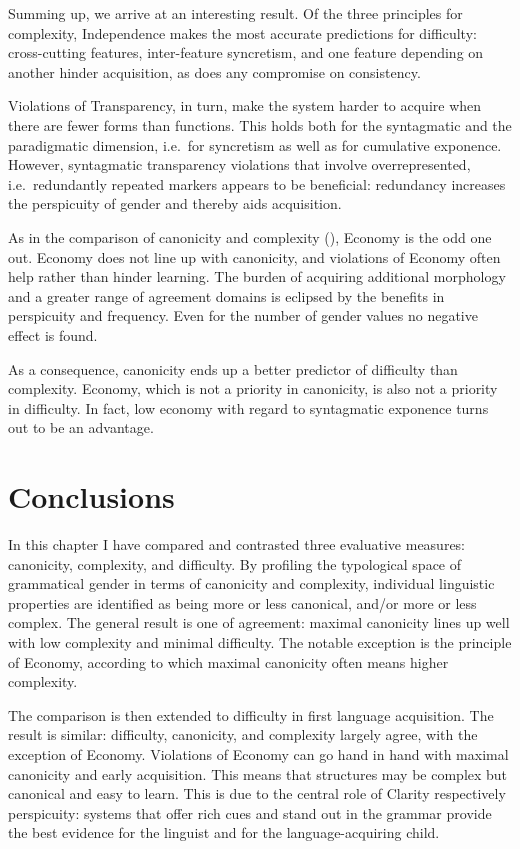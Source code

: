 \documentclass[output=collectionpaper]{langsci/langscibook}
\begin{document}
Summing up, we arrive at an interesting result. Of the three principles for complexity, Independence makes the most accurate predictions for difficulty: cross-cutting features, inter-feature syncretism, and one feature depending on another hinder acquisition, as does any compromise on consistency.

Violations of Transparency, in turn, make the system harder to acquire when there are fewer forms than functions. This holds both for the syntagmatic and the paradigmatic dimension, i.e.\ for syncretism as well as for cumulative exponence. However, syntagmatic transparency violations that involve overrepresented, i.e.\ redundantly repeated markers appears to be beneficial: redundancy increases the perspicuity of gender and thereby aids acquisition.

As in the comparison of canonicity and complexity (), Economy is the odd one out. Economy does not line up with canonicity, and violations of Economy often help rather than hinder learning. The burden of acquiring additional morphology and a greater range of agreement domains is eclipsed by the benefits in perspicuity and frequency. Even for the number of gender values no negative effect is found.

As a consequence, canonicity ends up a better predictor of difficulty than complexity. Economy, which is not a priority in canonicity, is also not a priority in difficulty. In fact, low economy with regard to syntagmatic exponence turns out to be an advantage.

\section{Conclusions}
\label{sec:Audr:Concl}

In this chapter I have compared and contrasted three evaluative measures: canonicity, complexity, and difficulty. By profiling the typological space of grammatical gender in terms of canonicity and complexity, individual linguistic properties are identified as being more or less canonical, and/or more or less complex. The general result is one of agreement: maximal canonicity lines up well with low complexity and minimal difficulty. The notable exception is the principle of Economy, according to which maximal canonicity often means higher complexity.

The comparison is then extended to difficulty in first language acquisition. The result is similar: difficulty, canonicity, and complexity largely agree, with the exception of Economy. Violations of Economy can go hand in hand with maximal canonicity and early acquisition. This means that structures may be complex but canonical and easy to learn. This is due to the central role of Clarity respectively perspicuity: systems that offer rich cues and stand out in the grammar provide the best evidence for the linguist and for the language-acquiring child.
\end{document}
